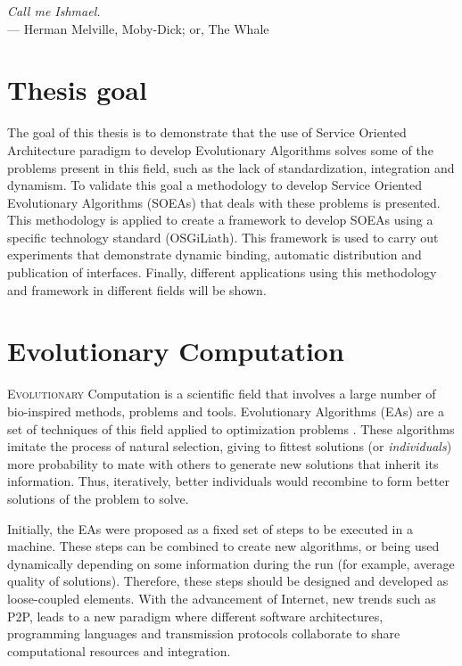 \label{chap:introduction}
\begin{flushright}{\slshape
    Call me Ishmael.} \\ \medskip
    --- {Herman Melville, Moby-Dick; or, The Whale}
\end{flushright}
\minitoc\mtcskip
\vfill



\section{Thesis goal} %
The goal of this thesis is to demonstrate that the use of Service Oriented Architecture paradigm to develop Evolutionary Algorithms solves some of the problems present in this field, such as the lack of standardization, integration and dynamism. To validate this goal a methodology to develop Service Oriented Evolutionary Algorithms (SOEAs) that deals with these problems is presented. This methodology is applied to create a framework to develop SOEAs using a specific technology standard (OSGiLiath). This framework is used to carry out experiments that demonstrate dynamic binding, automatic distribution and publication of interfaces. Finally, different applications using this methodology and framework in different fields will be shown.

\section{Evolutionary Computation}
\label{sec:intro:eas}

\lettrine{E}{volutionary} Computation is a scientific field that involves a large number of bio-inspired methods, problems and tools. Evolutionary Algorithms (EAs) are a set of techniques of this field applied to optimization problems \cite{eiben2010whatis}. These algorithms imitate the process of natural selection, giving to fittest solutions (or {\em individuals}) more probability to mate with others to generate new solutions that inherit its information. Thus, iteratively, better individuals would recombine to form better solutions of the problem to solve.

Initially, the EAs were proposed as a fixed set of steps to be executed in a machine. These steps can be combined to create new algorithms, or being used dynamically depending on some information during the run (for example, average quality of solutions). Therefore, these steps should be designed and developed as loose-coupled elements. With the advancement of Internet, new trends such as P2P, leads to a new paradigm where different software architectures, programming languages and transmission protocols collaborate to share computational resources and integration. 

